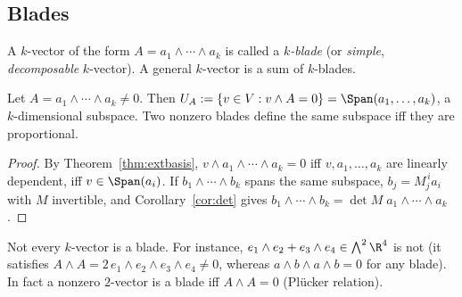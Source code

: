 \subsection{Blades}\label{sec:blades}
\begin{definition}[Blade]
A $k$-vector of the form $A=a_1\wedge\cdots\wedge a_k$ is called a \emph{$k$-blade} (or \emph{simple}, \emph{decomposable} $k$-vector).
A general $k$-vector is a sum of $k$-blades.
\end{definition}

\begin{proposition}\label{prop:blade}
Let $A=a_1\wedge\cdots\wedge a_k\neq0$. Then $U_A:=\{v\in V: v\wedge A=0\}=\Span(a_1,\dots,a_k)$, a $k$-dimensional subspace.
Two nonzero blades define the same subspace iff they are proportional.
\end{proposition}
\begin{proof}
By Theorem~\ref{thm:extbasis}, $v\wedge a_1\wedge\cdots\wedge a_k=0$ iff $v,a_1,\dots,a_k$ are linearly dependent, iff $v\in\Span(a_i)$. If $b_1\wedge\cdots\wedge b_k$ spans the same subspace, $b_j=M_j^{\,i}a_i$ with $M$ invertible, and Corollary~\ref{cor:det} gives $b_1\wedge\cdots\wedge b_k=\det M\;a_1\wedge\cdots\wedge a_k$.
\end{proof}

Not every $k$-vector is a blade. For instance, $e_1\wedge e_2+e_3\wedge e_4\in\bigwedge^2\R^4$ is not (it satisfies $A\wedge A=2\,e_1\wedge e_2\wedge e_3\wedge e_4\neq0$, whereas $a\wedge b\wedge a\wedge b=0$ for any blade). In fact a nonzero $2$-vector is a blade iff $A\wedge A=0$ (Pl\"ucker relation).



